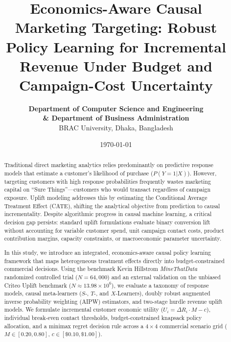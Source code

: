 \documentclass[11pt,a4paper]{article}
\title{\textbf{Economics-Aware Causal Marketing Targeting: Robust Policy Learning for Incremental Revenue Under Budget and Campaign-Cost Uncertainty}}
\author{
    \textbf{Department of Computer Science and Engineering} \\
    \textbf{\& Department of Business Administration} \\
    BRAC University, Dhaka, Bangladesh
}
\date{\today}
\begin{document}
\maketitle

\begin{abstract}
Traditional direct marketing analytics relies predominantly on predictive response models that estimate a customer's likelihood of purchase ($P(Y=1|X)$). However, targeting customers with high response probabilities frequently wastes marketing capital on ``Sure Things''---customers who would transact regardless of campaign exposure. Uplift modeling addresses this by estimating the Conditional Average Treatment Effect (CATE), shifting the analytical objective from prediction to causal incrementality. Despite algorithmic progress in causal machine learning, a critical decision gap persists: standard uplift formulations evaluate binary conversion lift without accounting for variable customer spend, unit campaign contact costs, product contribution margins, capacity constraints, or macroeconomic parameter uncertainty.

In this study, we introduce an integrated, economics-aware causal policy learning framework that maps heterogeneous treatment effects directly into budget-constrained commercial decisions. Using the benchmark Kevin Hillstrom \textit{MineThatData} randomized controlled trial ($N = 64,000$) and an external validation on the unbiased Criteo Uplift benchmark ($N \approx 13.98 \times 10^6$), we evaluate a taxonomy of response models, causal meta-learners ($S$-, $T$-, and $X$-Learners), doubly robust augmented inverse probability weighting (AIPW) estimators, and two-stage hurdle revenue uplift models. We formulate incremental customer economic utility ($U_i = \Delta R_i \cdot M - c$), individual break-even contact thresholds, budget-constrained knapsack policy allocation, and a minimax regret decision rule across a $4 \times 4$ commercial scenario grid ($M \in [0.20, 0.80]$, $c \in [\$0.10, \$1.00]$).


\end{abstract}
\end{document}
